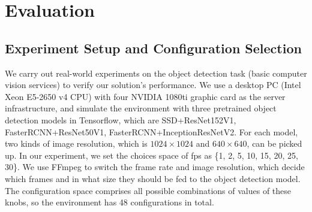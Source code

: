 \section{Evaluation}
\label{Section: experiment}

\subsection{Experiment Setup and Configuration Selection}
\label{subsec: configuration}
We carry out real-world experiments on the object detection task (basic computer vision services) to verify our solution’s performance. We use a desktop PC (Intel Xeon E5-2650 v4 CPU) with four NVIDIA 1080ti graphic card as the server infrastructure, and simulate the environment \cite{trade-offs} with three pretrained object detection models in Tensorflow, which are SSD+ResNet152V1, FasterRCNN+ResNet50V1, FasterRCNN+InceptionResNetV2. For each model, two kinds of image resolution, which is $1024\times1024$ and $640\times640$, can be picked up. In our experiment, we set the choices space of fps as \{1, 2, 5, 10, 15, 20, 25, 30\}. We use FFmpeg to switch the frame rate and image resolution, which decide which frames and in what size they should be fed to the object detection model. The configuration space comprises all possible combinations of values of these knobs, so the environment has 48 configurations in total.

